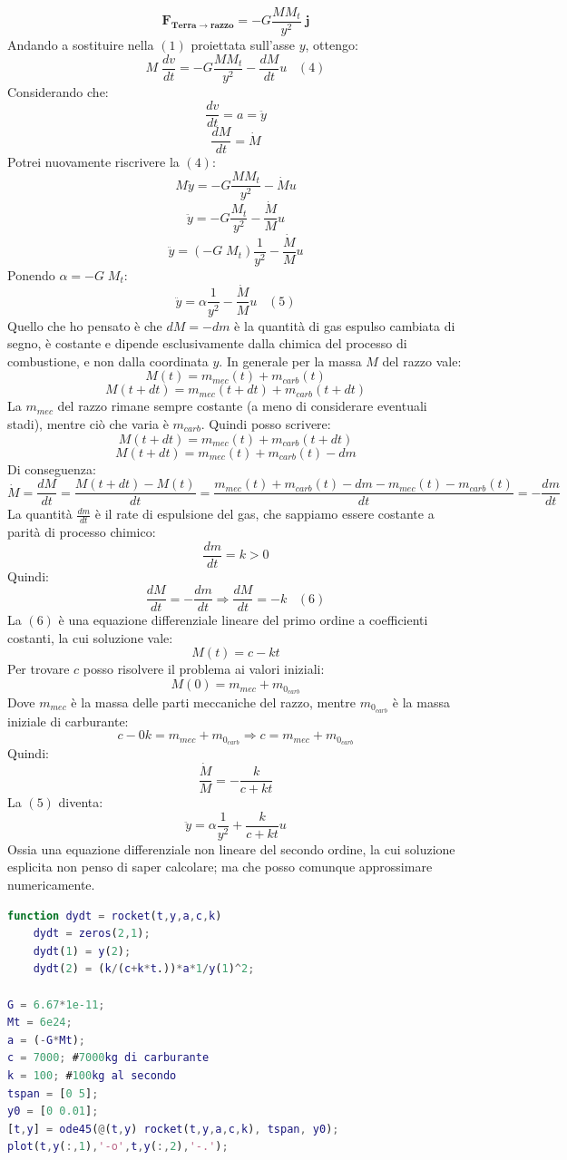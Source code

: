 \documentclass[10pt,a4paper]{book}
\begin{document}
$$
\mathbf{F_{Terra\rightarrow razzo}} = -G \frac{MM_t}{y^2}\;\mathbf j
$$
Andando a sostituire nella $(1)$ proiettata sull'asse $y$, ottengo:
$$
	M\;\frac{dv}{dt} = -G \frac{MM_t}{y^2}- \frac{dM}{dt} u\;\;\;(4)
$$
Considerando che:
$$
\frac{dv}{dt} = a = \ddot{y}
$$
$$
\frac{dM}{dt} = \dot{M}
$$
Potrei nuovamente riscrivere la $(4)$:
$$
M \ddot{y} = -G \frac{MM_t}{y^2} - \dot{M} u
$$
$$
\ddot{y} = -G \frac{M_t}{y^2} - \frac{\dot{M}}{M} u
$$
$$
\ddot{y} = (-G\;M_t) \frac{1}{y^2} - \frac{\dot{M}}{M} u
$$
Ponendo $\alpha = -G\;M_t$:
$$
\ddot{y} = \alpha \frac{1}{y^2} - \frac{\dot{M}}{M} u\;\;\;(5)
$$
Quello che ho pensato è che $dM = -dm$ è la quantità di gas espulso cambiata di segno, è costante e dipende esclusivamente dalla chimica del processo di combustione, e non dalla coordinata $y$. In generale per la massa $M$ del razzo vale:
$$
M(t) = m_{mec}(t) + m_{carb}(t)
$$
$$
M(t+dt) = m_{mec}(t+dt) + m_{carb}(t + dt)
$$
La $m_{mec}$ del razzo rimane sempre costante (a meno di considerare eventuali stadi), mentre ciò che varia è $m_{carb}$. Quindi posso scrivere:
$$
M(t+dt) = m_{mec}(t) + m_{carb}(t + dt)
$$
$$
M(t+dt) = m_{mec}(t) + m_{carb}(t) - dm
$$
Di conseguenza:
$$
\dot M = \frac{dM}{dt} = \frac{M(t + dt) - M(t)}{dt} = \frac{m_{mec}(t) + m_{carb}(t) - dm - m_{mec}(t) - m_{carb}(t) }{dt}
= -\frac{dm}{dt}$$ 
La quantità $\frac{dm}{dt}$ è il rate di espulsione del gas, che sappiamo essere costante a parità di processo chimico:
$$
\frac{dm}{dt} = k > 0
$$
Quindi:
$$
\frac{dM}{dt} = -\frac{dm}{dt} \Rightarrow \frac{dM}{dt} = -k\;\;\;(6)
$$
\newpage\noindent{}
La $(6)$ è una equazione differenziale lineare del primo ordine a coefficienti costanti, la cui soluzione vale:
$$
M(t) = c - kt
$$
Per trovare $c$ posso risolvere il problema ai valori iniziali:
$$
M(0) = m_{mec} + m_{0_{carb}} 
$$
Dove $m_{mec}$ è la massa delle parti meccaniche del razzo, mentre $m_{0_{carb}}$ è la massa iniziale di carburante:
$$
c - 0k = m_{mec} + m_{0_{carb}} \Rightarrow c = m_{mec} + m_{0_{carb}}
$$
Quindi:
$$
\frac{\dot M}{M} = -\frac{k}{c + kt}
$$
La $(5)$ diventa:
$$
\ddot{y} = \alpha \frac{1}{y^2} + \frac{k}{c + kt} u
$$
Ossia una equazione differenziale non lineare del secondo ordine, la cui soluzione esplicita non penso di saper calcolare; ma che posso comunque approssimare numericamente.
\begin{lstlisting}[language=MATLAB]
function dydt = rocket(t,y,a,c,k)
	dydt = zeros(2,1);
	dydt(1) = y(2);
	dydt(2) = (k/(c+k*t.))*a*1/y(1)^2;

G = 6.67*1e-11;
Mt = 6e24;
a = (-G*Mt);
c = 7000; #7000kg di carburante
k = 100; #100kg al secondo
tspan = [0 5];
y0 = [0 0.01];
[t,y] = ode45(@(t,y) rocket(t,y,a,c,k), tspan, y0);
plot(t,y(:,1),'-o',t,y(:,2),'-.');
\end{lstlisting}
\end{document}
